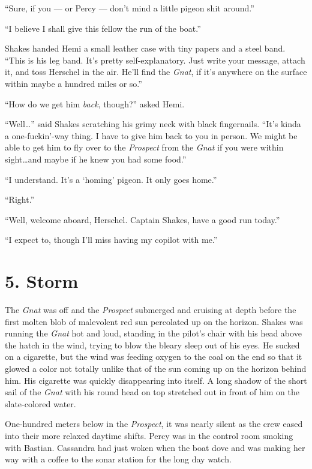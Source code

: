\documentclass[
]{scrbook}
\begin{document}
``Sure, if you --- or Percy --- don't mind a little pigeon shit
around.''

``I believe I shall give this fellow the run of the boat.''

Shakes handed Hemi a small leather case with tiny papers and a steel
band. ``This is his leg band. It's pretty self-explanatory. Just write
your message, attach it, and toss Herschel in the air. He'll find the
\emph{Gnat}, if it's anywhere on the surface within maybe a hundred
miles or so.''

``How do we get him \emph{back}, though?'' asked Hemi.

``Well\ldots{}'' said Shakes scratching his grimy neck with black
fingernails. ``It's kinda a one-fuckin'-way thing. I have to give him
back to you in person. We might be able to get him to fly over to the
\emph{Prospect} from the \emph{Gnat} if you were within sight\ldots and
maybe if he knew you had some food.''

``I understand. It's a `homing' pigeon. It only goes home.''

``Right.''

``Well, welcome aboard, Herschel. Captain Shakes, have a good run
today.''

``I expect to, though I'll miss having my copilot with me.''

\newpage

\hypertarget{storm}{%
\section{5. Storm}\label{storm}}

The \emph{Gnat} was off and the \emph{Prospect} submerged and cruising
at depth before the first molten blob of malevolent red sun percolated
up on the horizon. Shakes was running the \emph{Gnat} hot and loud,
standing in the pilot's chair with his head above the hatch in the wind,
trying to blow the bleary sleep out of his eyes. He sucked on a
cigarette, but the wind was feeding oxygen to the coal on the end so
that it glowed a color not totally unlike that of the sun coming up on
the horizon behind him. His cigarette was quickly disappearing into
itself. A long shadow of the short sail of the \emph{Gnat} with his
round head on top stretched out in front of him on the slate-colored
water.

One-hundred meters below in the \emph{Prospect}, it was nearly silent as
the crew eased into their more relaxed daytime shifts. Percy was in the
control room smoking with Bastian. Cassandra had just woken when the
boat dove and was making her way with a coffee to the sonar station for
the long day watch.
\end{document}
